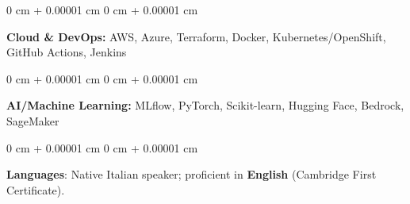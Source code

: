 \documentclass[10pt, letterpaper]{article}
\newenvironment{onecolentry}{
    \begin{adjustwidth}{
        0 cm + 0.00001 cm
    }{
        0 cm + 0.00001 cm
    }
}{
    \end{adjustwidth}
} %
\begin{document}
\vspace{0.2 cm}

\begin{onecolentry}
    \textbf{Cloud \& DevOps:} AWS, Azure, Terraform, Docker, Kubernetes/OpenShift, GitHub Actions, Jenkins
\end{onecolentry}

\vspace{0.2 cm}

\begin{onecolentry}
    \textbf{AI/Machine Learning:} MLflow, PyTorch, Scikit-learn, Hugging Face, Bedrock, SageMaker
\end{onecolentry}


\begin{onecolentry}
    \textbf{Languages}: Native Italian speaker; proficient in \textbf{English} (Cambridge First Certificate).
\end{onecolentry}
    
\end{document}
